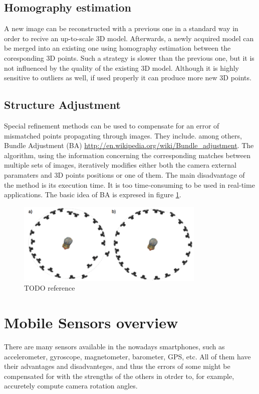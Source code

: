 \subsection{Homography estimation}
A new image can be reconstructed with a previous one in a standard way in order to recive an up-to-scale 3D model. Afterwards, a newly acquired model can be merged into an existing one using homography estimation between the coresponding 3D points. Such a strategy is slower than the previous one, but it is not influenced by the quality of the existing 3D model. Although it is highly sensitive to outliers as well, if used properly it can produce more new 3D points.
\subsection{Structure Adjustment}
Special refinement methods can be used to compensate for an error of mismatched points propagating through images. They include. among others, Bundle Adjustment (BA) \url{http://en.wikipedia.org/wiki/Bundle_adjustment}. The algorithm, using the information concerning the corresponding matches between multiple sets of images, iteratively modifies either both the camera external paramaters and 3D points positions or one of them. The main disadvantage of the method is its execution time. It is too time-consuming to be used in real-time applications. The basic idea of BA is expresed in figure \ref{fig:BundleAdjustment}.
\begin{figure}[p]
    \centering
    \includegraphics[width=0.8\textwidth]{BundleAdjustment}
    \caption{TODO reference}
    \label{fig:BundleAdjustment}
\end{figure}
\section{Mobile Sensors overview}
There are many sensors available in the nowadays smartphones, such as accelerometer, gyroscope, magnetometer, barometer, GPS, etc. All of them have their advantages and disadvanteges, and thus the errors of some might be compensated for with the strengths of the others in otrder to, for example, accuretely compute camera rotation angles.
